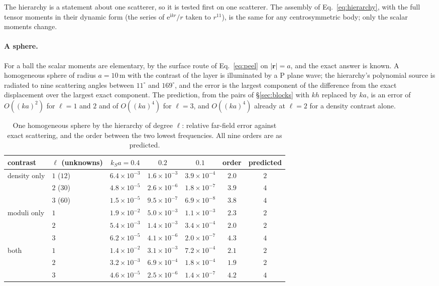 \documentclass[11pt,a4paper]{article}
\begin{document}
The hierarchy is a statement about one scatterer, so it is tested first on one scatterer. The assembly
of Eq.~\eqref{eq:hierarchy}, with the full tensor moments in their dynamic form (the series of
$\mathrm{e}^{\mathrm{i}kr}/r$ taken to $r^{11}$), is the same for any centrosymmetric body; only the
scalar moments change.

\paragraph{A sphere.} For a ball the scalar moments are elementary, by the surface route of
Eq.~\eqref{eq:peel} on $|\mathbf r|=a$, and the exact answer is known. A homogeneous sphere of radius
$a=10$\,m with the contrast of the layer is illuminated by a P plane wave; the hierarchy's
polynomial source is radiated to nine scattering angles between $11^\circ$ and $169^\circ$, and the
error is the largest component of the difference from the exact displacement
\citep{YingTruell1956,PaoMow1973} over the largest exact component. The prediction, from the pairs of
\S\ref{sec:blocks} with $kh$ replaced by $ka$, is an error of $O((ka)^2)$ for $\ell=1$ and $2$ and of
$O((ka)^4)$ for $\ell=3$, and $O((ka)^4)$ already at $\ell=2$ for a density contrast alone.
\begin{table}[htbp]
\centering
\caption{One homogeneous sphere by the hierarchy of degree $\ell$: relative far-field error against
exact scattering, and the order between the two lowest frequencies. All nine orders are as
predicted.}\label{tab:hiersphere}
\small
\begin{tabular}{@{}llccccc@{}}
\toprule
contrast & $\ell$ (unknowns) & $k_Sa=0.4$ & $0.2$ & $0.1$ & order & predicted \\
\midrule
density only & $1$ ($12$) & $6.4\times10^{-3}$ & $1.6\times10^{-3}$ & $3.9\times10^{-4}$ & $2.0$ & $2$ \\
 & $2$ ($30$) & $4.8\times10^{-5}$ & $2.6\times10^{-6}$ & $1.8\times10^{-7}$ & $3.9$ & $4$ \\
 & $3$ ($60$) & $1.5\times10^{-5}$ & $9.5\times10^{-7}$ & $6.9\times10^{-8}$ & $3.8$ & $4$ \\
moduli only & $1$ & $1.9\times10^{-2}$ & $5.0\times10^{-3}$ & $1.1\times10^{-3}$ & $2.3$ & $2$ \\
 & $2$ & $5.4\times10^{-3}$ & $1.4\times10^{-3}$ & $3.4\times10^{-4}$ & $2.0$ & $2$ \\
 & $3$ & $6.2\times10^{-5}$ & $4.1\times10^{-6}$ & $2.0\times10^{-7}$ & $4.3$ & $4$ \\
both & $1$ & $1.4\times10^{-2}$ & $3.1\times10^{-3}$ & $7.2\times10^{-4}$ & $2.1$ & $2$ \\
 & $2$ & $3.2\times10^{-3}$ & $6.9\times10^{-4}$ & $1.8\times10^{-4}$ & $1.9$ & $2$ \\
 & $3$ & $4.6\times10^{-5}$ & $2.5\times10^{-6}$ & $1.4\times10^{-7}$ & $4.2$ & $4$ \\
\bottomrule
\end{tabular}
\end{table}
\end{document}
